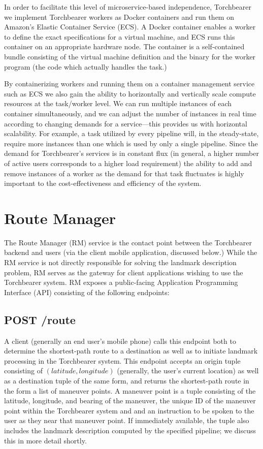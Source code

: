 In order to facilitate this level of microservice-based independence, Torchbearer we implement Torchbearer workers as Docker containers and run them on Amazon's Elastic Container Service (ECS). A Docker container enables a worker to define the exact specifications for a virtual machine, and ECS runs this container on an appropriate hardware node. The container is a self-contained bundle consisting of the virtual machine definition and the binary for the worker program (the code which actually handles the task.) 

By containerizing workers and running them on a container management service such as ECS we also gain the ability to horizontally and vertically scale compute resources at the task/worker level. We can run multiple instances of each container simultaneously, and we can adjust the number of instances in real time according to changing demands for a service---this provides us with horizontal scalability. For example, a task utilized by every pipeline will, in the steady-state, require more instances than one which is used by only a single pipeline. Since the demand for Torchbearer’s services is in constant flux (in general, a higher number of active users corresponds to a higher load requirement) the ability to add and remove instances of a worker as the demand for that task fluctuates is highly important to the cost-effectiveness and efficiency of the system.

\section{Route Manager}
The Route Manager (RM) service is the contact point between the Torchbearer backend and users (via the client mobile application, discussed below.) While the RM service is not directly responsible for solving the landmark description problem, RM serves as the gateway for client applications wishing to use the Torchbearer system. RM exposes a public-facing Application Programming Interface (API) consisting of the following endpoints:

\subsection{POST /route}
A client (generally an end user's mobile phone) calls this endpoint both to determine the shortest-path route to a destination as well as to initiate landmark processing in the Torchbearer system. This endpoint accepts an origin tuple consisting of $(latitude, longitude)$ (generally, the user's current location) as well as a destination tuple of the same form, and returns the shortest-path route in the form a list of maneuver points. A maneuver point is a tuple consisting of the latitude, longitude, and bearing of the maneuver, the unique ID of the maneuver point within the Torchbearer system and and an instruction to be spoken to the user as they near that maneuver point. If immediately available, the tuple also includes the landmark description computed by the specified pipeline; we discuss this in more detail shortly.

